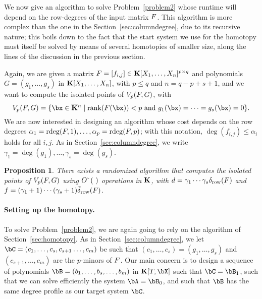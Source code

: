\documentclass[12pt]{article}
\newtheorem{proposition}[definition]{Proposition}
\begin{document}
We now give an algorithm to solve Problem~\ref{problem2} whose runtime
will depend on the row-degrees of the input matrix ${F}$. This
algorithm is more complex than the one in the
Section~\ref{sec:columndegree}, due to its recursive nature; this
boils down to the fact that the start system we use for the homotopy
must itself be solved by means of several homotopies of smaller size,
along the lines of the discussion in the previous section.

Again, we are given a matrix ${F} =[f_{i,j}]\in \mathbf{K}[X_1,\dots,X_n]^{p
  \times q}$ and polynomials $G=(g_1,\dots,g_s)$ in
$\mathbf{K}[X_1,\dots,X_n]$, with $p \leq q$ and $n = q-p+s+1$, and we want to
compute the isolated points of $V_{p}({F},G)$, with
$$\VpFG{p}{\mF}{G} = \{\bx \in \KKbar{}^n \mid \mathrm{rank}(\mF({\bx})) < p
\text{~and~} g_1(\bx)=\cdots=g_s(\bx)=0\}.$$ We are now interested in
designing an algorithm whose cost depends on the row degrees
$\alpha_1=\mathrm{rdeg}({F},1),\dots,\alpha_p=\mathrm{rdeg}({F},p)$; with this
notation, $\deg(f_{i,j}) \leq \alpha_i$ holds for all $i,j$. As in 
Section~\ref{sec:columndegree}, we write
$\gamma_1=\deg(g_1),\dots,\gamma_s=\deg(g_s)$.

\begin{proposition}\label{prop:rowdegree}
  There exists a randomized algorithm that computes the isolated
  points of $V_{p}({F},G)$ using ${O}{\,\tilde{ }\,}\left (\ \right)$ operations in
  $\mathbf{K}$, with $d=\gamma_1\cdots\gamma_s \delta_{\rm row}({F})$ and
  $f=(\gamma_1+1)\cdots(\gamma_s+1) \tilde\delta_{\rm row}({F})$.
\end{proposition}



\paragraph{Setting up the homotopy.}
To solve Problem~\ref{problem2}, we are again going to rely on the
algorithm of Section~\ref{sec:homotopy}. As in Section~\ref{sec:columndegree},
we let $\bC=(c_1,\dots,c_s,c_{s+1}\dots,c_m)$ be such that
$(c_1,\dots,c_s)=(g_1,\dots,g_s)$ and $(c_{s+1},\dots,c_m)$ are the
$p$-minors of ${F}$. Our main concern is to design a sequence of
polynomials $\bB=(b_1,\dots,b_s,\dots,b_m)$ in $\KK[T,\bX]$ such that
$\bC=\bB_1$, such that we can solve efficiently the system
$\bA=\bB_0$, and such that $\bB$ has the same degree profile as our target system
$\bC$.
\end{document}
